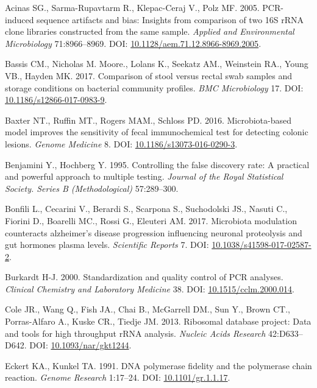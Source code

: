 \documentclass[11pt,]{article}
\begin{document}
\hypertarget{refs}{}
\hypertarget{ref-Acinas2005}{}
Acinas SG., Sarma-Rupavtarm R., Klepac-Ceraj V., Polz MF. 2005.
PCR-induced sequence artifacts and bias: Insights from comparison of two
16S rRNA clone libraries constructed from the same sample. \emph{Applied
and Environmental Microbiology} 71:8966--8969. DOI:
\href{https://doi.org/10.1128/aem.71.12.8966-8969.2005}{10.1128/aem.71.12.8966-8969.2005}.

\hypertarget{ref-storage_Bassis_2017}{}
Bassis CM., Nicholas M. Moore., Lolans K., Seekatz AM., Weinstein RA.,
Young VB., Hayden MK. 2017. Comparison of stool versus rectal swab
samples and storage conditions on bacterial community profiles.
\emph{BMC Microbiology} 17. DOI:
\href{https://doi.org/10.1186/s12866-017-0983-9}{10.1186/s12866-017-0983-9}.

\hypertarget{ref-Baxter2016}{}
Baxter NT., Ruffin MT., Rogers MAM., Schloss PD. 2016. Microbiota-based
model improves the sensitivity of fecal immunochemical test for
detecting colonic lesions. \emph{Genome Medicine} 8. DOI:
\href{https://doi.org/10.1186/s13073-016-0290-3}{10.1186/s13073-016-0290-3}.

\hypertarget{ref-benjamini_controlling_1995}{}
Benjamini Y., Hochberg Y. 1995. Controlling the false discovery rate: A
practical and powerful approach to multiple testing. \emph{Journal of
the Royal Statistical Society. Series B (Methodological)} 57:289--300.

\hypertarget{ref-Bonfili2017}{}
Bonfili L., Cecarini V., Berardi S., Scarpona S., Suchodolski JS.,
Nasuti C., Fiorini D., Boarelli MC., Rossi G., Eleuteri AM. 2017.
Microbiota modulation counteracts alzheimer's disease progression
influencing neuronal proteolysis and gut hormones plasma levels.
\emph{Scientific Reports} 7. DOI:
\href{https://doi.org/10.1038/s41598-017-02587-2}{10.1038/s41598-017-02587-2}.

\hypertarget{ref-Burkardt2000}{}
Burkardt H-J. 2000. Standardization and quality control of PCR analyses.
\emph{Clinical Chemistry and Laboratory Medicine} 38. DOI:
\href{https://doi.org/10.1515/cclm.2000.014}{10.1515/cclm.2000.014}.

\hypertarget{ref-rdp_Cole_2013}{}
Cole JR., Wang Q., Fish JA., Chai B., McGarrell DM., Sun Y., Brown CT.,
Porras-Alfaro A., Kuske CR., Tiedje JM. 2013. Ribosomal database
project: Data and tools for high throughput rRNA analysis. \emph{Nucleic
Acids Research} 42:D633--D642. DOI:
\href{https://doi.org/10.1093/nar/gkt1244}{10.1093/nar/gkt1244}.

\hypertarget{ref-Eckert1991}{}
Eckert KA., Kunkel TA. 1991. DNA polymerase fidelity and the polymerase
chain reaction. \emph{Genome Research} 1:17--24. DOI:
\href{https://doi.org/10.1101/gr.1.1.17}{10.1101/gr.1.1.17}.
\end{document}
